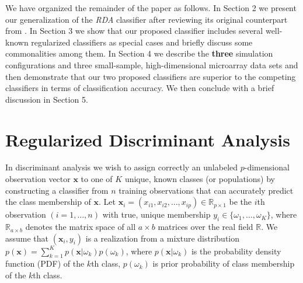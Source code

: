 \documentclass[11pt]{article}
\begin{document}
We have organized the remainder of the paper as follows. In Section 2 we present our generalization of the \emph{RDA} classifier after reviewing its original counterpart from \cite{Friedman:1989tm}. In Section 3 we show that our proposed classifier includes several well-known regularized classifiers as special cases and briefly discuss some commonalities among them. In Section 4 we describe the \textbf{three} simulation configurations and three small-sample, high-dimensional microarray data sets and then demonstrate that our two proposed classifiers are superior to the competing classifiers in terms of classification accuracy. We then conclude with a brief discussion in Section 5.

\section{Regularized Discriminant Analysis}
\label{sec:rda}

In discriminant analysis we wish to assign correctly an unlabeled $p$-dimensional observation vector $\bm x$ to one of $K$ unique, known classes (or populations) by constructing a classifier from $n$ training observations that can accurately predict the class membership of $\bm x$. Let $\bm x_i = (x_{i1}, x_{i2}, \ldots, x_{ip}) \in \mathbb{R}_{p \times 1}$ be the $i$th observation $(i = 1, \ldots, n)$ with true, unique membership $y_i \in \{\omega_1, \ldots, \omega_K\}$, where $\mathbb{R}_{a \times b}$ denotes the matrix space of all $a \times b$ matrices over the real field $\mathbb{R}$. We assume that $(\bm x_i, y_i)$ is a realization from a mixture distribution $p(\bm x) = \sum_{k=1}^K p(\bm x | \omega_k) p(\omega_k)$, where $p(\bm x | \omega_k)$ is the probability density function (PDF) of the $k$th class, $p(\omega_k)$ is prior probability of class membership of the $k$th class.
\end{document}
